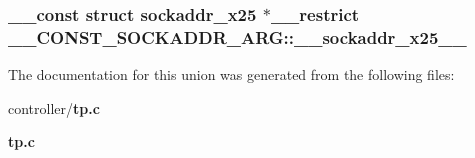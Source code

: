 \subsubsection[{\_\-\_\-sockaddr\_\-x25\_\-\_\-}]{\setlength{\rightskip}{0pt plus 5cm}\_\-\_\-const struct sockaddr\_\-x25 $\ast$\_\-\_\-restrict {\bf \_\-\_\-CONST\_\-SOCKADDR\_\-ARG::\_\-\_\-sockaddr\_\-x25\_\-\_\-}}\label{union____CONST__SOCKADDR__ARG_aa3ab67b5a2a0555202719df61b50a6bb}


The documentation for this union was generated from the following files:\begin{DoxyCompactItemize}
\item 
controller/{\bf tp.c}\item 
{\bf tp.c}\end{DoxyCompactItemize}
